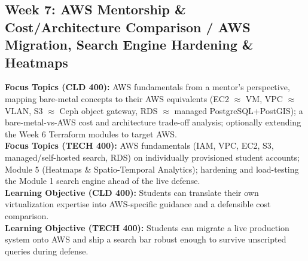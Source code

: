 \documentclass[10pt, a4paper]{article}
\begin{document}
\newpage

\subsection*{Week 7: AWS Mentorship \& Cost/Architecture Comparison / AWS Migration, Search Engine Hardening \& Heatmaps}
\textbf{Focus Topics (CLD 400):} AWS fundamentals from a mentor's perspective, mapping bare-metal concepts to their AWS equivalents (EC2 $\approx$ VM, VPC $\approx$ VLAN, S3 $\approx$ Ceph object gateway, RDS $\approx$ managed PostgreSQL+PostGIS); a bare-metal-vs-AWS cost and architecture trade-off analysis; optionally extending the Week 6 Terraform modules to target AWS. \\[0.35em]
\textbf{Focus Topics (TECH 400):} AWS fundamentals (IAM, VPC, EC2, S3, managed/self-hosted search, RDS) on individually provisioned student accounts; Module 5 (Heatmaps \& Spatio-Temporal Analytics); hardening and load-testing the Module 1 search engine ahead of the live defense. \\[0.35em]
\textbf{Learning Objective (CLD 400):} Students can translate their own virtualization expertise into AWS-specific guidance and a defensible cost comparison. \\[0.35em]
\textbf{Learning Objective (TECH 400):} Students can migrate a live production system onto AWS and ship a search bar robust enough to survive unscripted queries during defense.
\end{document}
